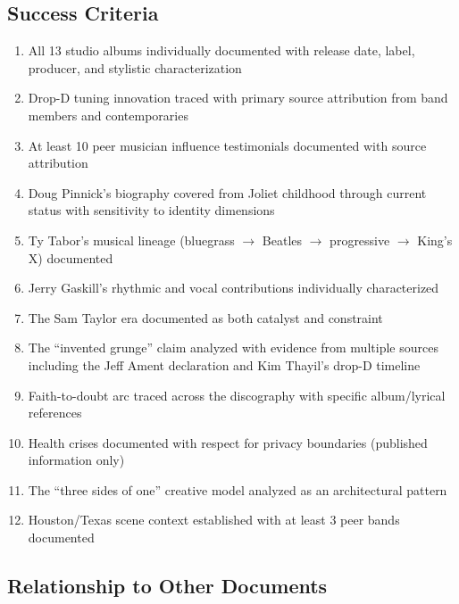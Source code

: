 \documentclass[11pt,letterpaper]{article}
\begin{document}
\subsection{Success Criteria}

\begin{enumerate}[leftmargin=2em]
\item All 13 studio albums individually documented with release date, label, producer, and stylistic characterization
\item Drop-D tuning innovation traced with primary source attribution from band members and contemporaries
\item At least 10 peer musician influence testimonials documented with source attribution
\item Doug Pinnick's biography covered from Joliet childhood through current status with sensitivity to identity dimensions
\item Ty Tabor's musical lineage (bluegrass $\rightarrow$ Beatles $\rightarrow$ progressive $\rightarrow$ King's X) documented
\item Jerry Gaskill's rhythmic and vocal contributions individually characterized
\item The Sam Taylor era documented as both catalyst and constraint
\item The ``invented grunge'' claim analyzed with evidence from multiple sources including the Jeff Ament declaration and Kim Thayil's drop-D timeline
\item Faith-to-doubt arc traced across the discography with specific album/lyrical references
\item Health crises documented with respect for privacy boundaries (published information only)
\item The ``three sides of one'' creative model analyzed as an architectural pattern
\item Houston/Texas scene context established with at least 3 peer bands documented
\end{enumerate}

\subsection{Relationship to Other Documents}
\end{document}
